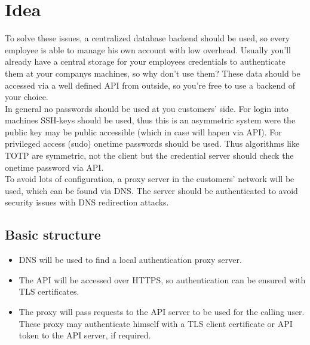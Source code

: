 %
%
%
%
%
%
%


\section{Idea}

To solve these issues, a centralized database backend should be used, so every
employee is able to manage his own account with low overhead. Usually you'll
already have a central storage for your employees credentials to authenticate
them at your companys machines, so why don't use them? These data should be
accessed via a well defined API from outside, so you're free to use a backend of
your choice. \\

In general no passwords should be used at you customers' side. For login into
machines SSH-keys should be used, thus this is an asymmetric system were the
public key may be public accessible (which in case will hapen via API). For
privileged access (sudo) onetime passwords should be used. Thus algorithms like
TOTP are symmetric, not the client but the credential server should check the
onetime password via API. \\

To avoid lots of configuration, a proxy server in the customers' network will be
used, which can be found via DNS. The server should be authenticated to avoid
security issues with DNS redirection attacks.


\subsection{Basic structure}

\begin{itemize}
	\item DNS will be used to find a local authentication proxy server.
	\item The API will be accessed over HTTPS, so authentication can be
		ensured with TLS certificates.
	\item The proxy will pass requests to the API server to be used for the
		calling user. These proxy may authenticate himself with a TLS client
		certificate or API token to the API server, if required.
\end{itemize}

